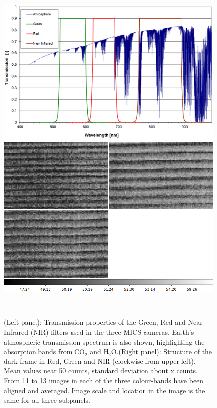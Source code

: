 \documentclass[final,hyperref={pdfpagelabels=false}]{beamer}
\begin{document}
\begin{frame}[t]
\begin{columns}[t]
\begin{column}{.23\textwidth}
\begin{block}
\begin{figure}
    \centering
    \includegraphics[scale=0.41]{fig/mics_filter_characteristics.png}
    \hspace{0.5cm}
    \includegraphics[scale=0.41]{fig/ripplefig.png}
    \caption{(Left panel): Transmission properties of the Green, Red and Near-Infrared (NIR) filters used in the three MICS cameras. Earth's atmospheric transmission spectrum is also shown, highlighting the absorption bands from CO$_2$ and H$_2$O.(Right panel): Structure of the dark frame in Red, Green and NIR (clockwise from upper left). Mean values near 50 counts, standard deviation about x counts. From 11 to 13 images in each of the three colour-bands have been aligned and averaged. Image scale and location in the image is the same for all three subpanels. }
    ~\label{fig:filterfig}
\end{figure}


\end{block}
\end{column}
\end{columns}
\end{frame}
\end{document}
